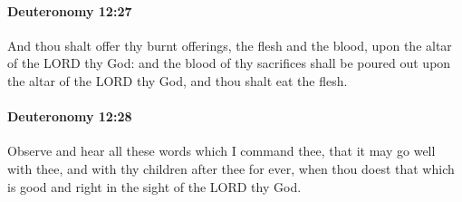 		\paragraph{Deuteronomy 12:27} %
			\label{DEUTERONOMY-12-27}

			And thou shalt offer thy burnt offerings, the flesh and the blood, upon the altar of the LORD thy God: and the blood of thy sacrifices shall be poured out upon the altar of the LORD thy God, and thou shalt eat the flesh.


		\paragraph{Deuteronomy 12:28} %
			\label{DEUTERONOMY-12-28}

			Observe and hear all these words which I command thee, that it may go well with thee, and with thy children after thee for ever, when thou doest that which is good and right in the sight of the LORD thy God.

